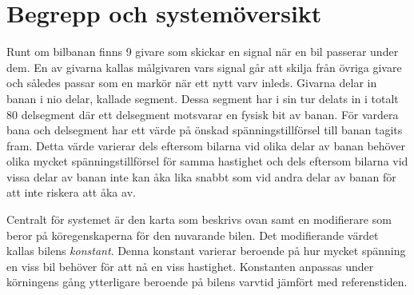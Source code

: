 \section{Begrepp och systemöversikt}
\label{sec:begrepp och systemöversikt}

Runt om bilbanan finns 9 givare som skickar en signal när en bil passerar under
dem. En av givarna kallas målgivaren vars signal går att skilja från övriga
givare och således passar som en markör när ett nytt varv inleds. Givarna
delar in banan i nio delar, kallade segment. Dessa segment har i sin tur delats
in i totalt 80 delsegment där ett delsegment motsvarar en fysisk bit av banan.
För vardera bana och delsegment har ett värde på önskad spänningstillförsel till
banan tagits fram. Detta värde varierar dels eftersom bilarna vid olika delar
av banan behöver olika mycket spänningstillförsel för samma hastighet och dels
eftersom bilarna vid vissa delar av banan inte kan åka lika snabbt som vid andra
delar av banan för att inte riskera att åka av.

Centralt för systemet är den karta som beskrivs ovan samt en
modifierare som beror på köregenskaperna för den nuvarande bilen. Det
modifierande värdet kallas bilens \emph{konstant}. Denna konstant varierar
beroende på hur mycket spänning en viss bil behöver för att nå en viss
hastighet. Konstanten anpassas under körningens gång ytterligare beroende på
bilens varvtid jämfört med referenstiden.


